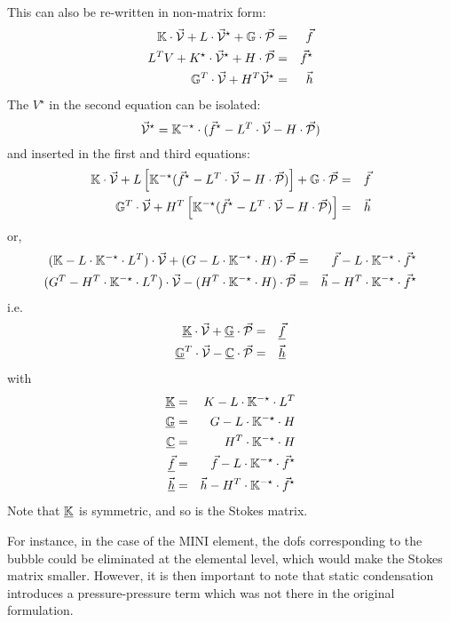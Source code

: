This can also be re-written in non-matrix form:
\begin{eqnarray}
{\mathbb{K}} \cdot \vec{\cal V} + L \cdot \vec{\cal V}^\star + {\mathbb{G}} \cdot \vec{\cal P} &=& \vec{f} \\
L^T V + K^\star \cdot  \vec{\cal V}^\star + H \cdot \vec{\cal P} &=& \vec{f}^\star \\
{\mathbb{G}}^T \cdot \vec{\cal V} + H^T \vec{\cal V}^\star &=& \vec{h}
\end{eqnarray}
The $V^\star$ in the second equation can be isolated:
\[
\vec{\cal V}^\star = {\mathbb{K}}^{-\star} \cdot ( \vec{f}^\star - L^T \cdot \vec{\cal V} - H \cdot \vec{\cal P})
\]
and inserted in the first and third equations:
\begin{eqnarray}
{\mathbb{K}} \cdot \vec{\cal V} + L \left[ {\mathbb{K}}^{-\star} ( \vec{f}^\star - L^T \cdot \vec{\cal V} - H \cdot \vec{\cal P} )  \right] + {\mathbb{G}} \cdot \vec{\cal P} &=& \vec{f} \\
{\mathbb{G}}^T \cdot \vec{\cal V} + H^T \left[  {\mathbb{K}}^{-\star} ( \vec{f}^\star - L^T \cdot \vec{\cal V} - H \cdot \vec{\cal P}) \right]  &=& \vec{h}
\end{eqnarray}
or,
\begin{eqnarray}
({\mathbb{K}}-L\cdot {\mathbb{K}}^{-\star} \cdot L^T)\cdot \vec{\cal V} + (G-L\cdot {\mathbb{K}}^{-\star} \cdot H) \cdot \vec{\cal P} &=& \vec{f}-L\cdot {\mathbb{K}}^{-\star} \cdot \vec{f}^\star \\
(G^T -H^T\cdot {\mathbb{K}}^{-\star}\cdot  L^T ) \cdot \vec{\cal V}  - 
(H^T \cdot {\mathbb{K}}^{-\star} \cdot H )\cdot \vec{\cal P}   &=& \vec{h} -H^T\cdot {\mathbb{K}}^{-\star}\cdot \vec{f}^\star
\end{eqnarray}
i.e.
\begin{eqnarray}
\underline{{\mathbb{K}}} \cdot \vec{\cal V} + \underline{{\mathbb{G}}}\cdot \vec{\cal P} &=& \underline{\vec{f}} \\
\underline{{\mathbb{G}}}^T \cdot \vec{\cal V} - \underline{{\mathbb{C}}} \cdot \vec{\cal P} &=& \underline{\vec{h}}
\end{eqnarray}
with
\begin{eqnarray}
\underline{{\mathbb{K}}}&=& K-L\cdot {\mathbb{K}}^{-\star} \cdot L^T \\
\underline{{\mathbb{G}}}&=& G-L\cdot {\mathbb{K}}^{-\star} \cdot H \\
\underline{{\mathbb{C}}}&=& H^T \cdot {\mathbb{K}}^{-\star} \cdot H \\
\underline{\vec{f}}&=& \vec{f}-L\cdot {\mathbb{K}}^{-\star} \cdot \vec{f}^\star \\
\underline{\vec{h}}&=& \vec{h} -H^T\cdot {\mathbb{K}}^{-\star}\cdot \vec{f}^\star
\end{eqnarray}
Note that $\underline{{\mathbb{K}}}$ is symmetric, and so is the Stokes matrix.


For instance, in the case of the MINI element, the dofs corresponding to the bubble 
could be eliminated at the elemental level, which would make the Stokes matrix smaller. 
However, it is then important to note that static condensation introduces a 
pressure-pressure term which was not there in the original formulation.









